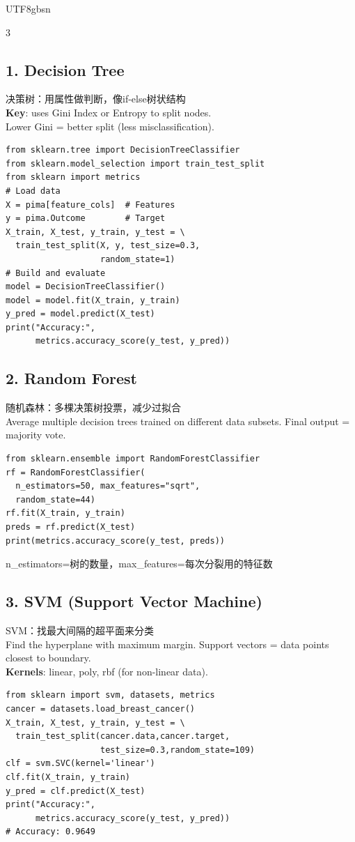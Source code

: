\documentclass[9pt,landscape,a4paper]{article}
\newcommand{\zhint}[1]{{\scriptsize\color{gray!70!black}#1}}
\begin{document}
\begin{CJK}{UTF8}{gbsn}
\begin{multicols}{3}
\subsection{1. Decision Tree}
\zhint{决策树：用属性做判断，像if-else树状结构}\\
\textbf{Key}: uses Gini Index or Entropy to split nodes.\\
Lower Gini = better split (less misclassification).

\begin{lstlisting}
from sklearn.tree import DecisionTreeClassifier
from sklearn.model_selection import train_test_split
from sklearn import metrics
# Load data
X = pima[feature_cols]  # Features
y = pima.Outcome        # Target
X_train, X_test, y_train, y_test = \
  train_test_split(X, y, test_size=0.3,
                   random_state=1)
# Build and evaluate
model = DecisionTreeClassifier()
model = model.fit(X_train, y_train)
y_pred = model.predict(X_test)
print("Accuracy:",
      metrics.accuracy_score(y_test, y_pred))
\end{lstlisting}

\subsection{2. Random Forest}
\zhint{随机森林：多棵决策树投票，减少过拟合}\\
Average multiple decision trees trained on different data subsets. Final output = majority vote.

\begin{lstlisting}
from sklearn.ensemble import RandomForestClassifier
rf = RandomForestClassifier(
  n_estimators=50, max_features="sqrt",
  random_state=44)
rf.fit(X_train, y_train)
preds = rf.predict(X_test)
print(metrics.accuracy_score(y_test, preds))
\end{lstlisting}
\zhint{n\_estimators=树的数量，max\_features=每次分裂用的特征数}

\subsection{3. SVM (Support Vector Machine)}
\zhint{SVM：找最大间隔的超平面来分类}\\
Find the hyperplane with maximum margin. Support vectors = data points closest to boundary.\\
\textbf{Kernels}: linear, poly, rbf (for non-linear data).

\begin{lstlisting}
from sklearn import svm, datasets, metrics
cancer = datasets.load_breast_cancer()
X_train, X_test, y_train, y_test = \
  train_test_split(cancer.data,cancer.target,
                   test_size=0.3,random_state=109)
clf = svm.SVC(kernel='linear')
clf.fit(X_train, y_train)
y_pred = clf.predict(X_test)
print("Accuracy:",
      metrics.accuracy_score(y_test, y_pred))
# Accuracy: 0.9649
\end{lstlisting}


\end{multicols}
\end{CJK}
\end{document}
